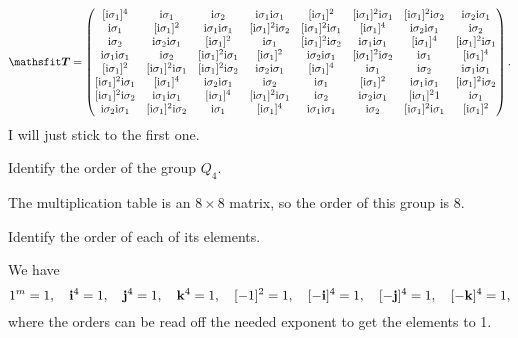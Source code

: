 \documentclass[11pt, english, fleqn, DIV=15, headinclude, BCOR=1cm]{scrartcl}
\begin{document}
\[
    \tens T =
    \begin{pmatrix}
         [\iup\1]^4   &  \iup\1 &  \iup\2 &  \iup\1\iup\1 & [\iup\1]^2   & [\iup\1]^2\iup\1 & [\iup\1]^2\iup\2 & \iup\2\iup\1 \\
         \iup\1 & [\iup\1]^2   &  \iup\1\iup\1 & [\iup\1]^2\iup\2 & [\iup\1]^2\iup\1 &  [\iup\1]^4   & \iup\2\iup\1 &  \iup\2 \\
         \iup\2 & \iup\2\iup\1 & [\iup\1]^2   &  \iup\1 & [\iup\1]^2\iup\2 &  \iup\1\iup\1 &  [\iup\1]^4   & [\iup\1]^2\iup\1 \\
         \iup\1\iup\1 &  \iup\2 & [\iup\1]^2\iup\1 & [\iup\1]^2   & \iup\2\iup\1 & [\iup\1]^2\iup\2 &  \iup\1 &  [\iup\1]^4   \\
        [\iup\1]^2   & [\iup\1]^2\iup\1 & [\iup\1]^2\iup\2 & \iup\2\iup\1 &  [\iup\1]^4   &  \iup\1 &  \iup\2 &  \iup\1\iup\1 \\
        [\iup\1]^2\iup\1 &  [\iup\1]^4   & \iup\2\iup\1 &  \iup\2 &  \iup\1 & [\iup\1]^2   &  \iup\1\iup\1 & [\iup\1]^2\iup\2 \\
        [\iup\1]^2\iup\2 &  \iup\1\iup\1 &  [\iup\1]^4   & [\iup\1]^2\iup\1 &  \iup\2 & \iup\2\iup\1 & [\iup\1]^21   &  \iup\1 \\
        \iup\2\iup\1 & [\iup\1]^2\iup\2 &  \iup\1 &  [\iup\1]^4   &  \iup\1\iup\1 &  \iup\2 & [\iup\1]^2\iup\1 & [\iup\1]^2  
    \end{pmatrix}.
\]
I will just stick to the first one.

\begin{problem}
    Identify the order of the group $Q_4$.
\end{problem}

The multiplication table is an $8 \times 8$ matrix, so the order of this group
is 8.

\begin{problem}
    Identify the order of each of its elements.
\end{problem}

We have
\[
    1^m = 1
    ,\quad \mathbf i^4 = 1
    ,\quad \mathbf j^4 = 1
    ,\quad \mathbf k^4 = 1
    ,\quad [-1]^2 = 1
    ,\quad [-\mathbf i]^4 = 1
    ,\quad [-\mathbf j]^4 = 1
    ,\quad [-\mathbf k]^4 = 1,
\]
where the orders can be read off the needed exponent to get the elements to 1.
\end{document}
